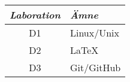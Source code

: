 \documentclass[a4paper]{memoir}
\begin{document}
\begin{Items}
    {\hspace{0.5cm}
    \begin{tabular}{cl}
        \emph{Laboration} & \emph{Ämne} \\ \midrule
        D1                & Linux/Unix  \\
        D2                & \LaTeX      \\
        D3                & Git/GitHub  \\
    \end{tabular}
    }





\end{Items}
\end{document}
